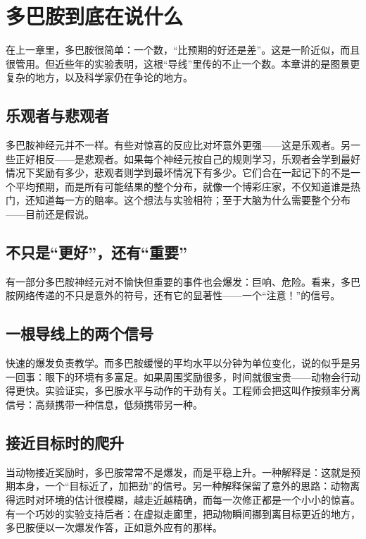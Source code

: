 \chapter{多巴胺到底在说什么}

在上一章里，多巴胺很简单：一个数，“比预期的好还是差”。这是一阶近似，而且很管用。但近些年的实验表明，这根“导线”里传的不止一个数。本章讲的是图景更复杂的地方，以及科学家仍在争论的地方。

\section*{乐观者与悲观者}

多巴胺神经元并不一样。有些对惊喜的反应比对坏意外更强——这是乐观者。另一些正好相反——是悲观者。如果每个神经元按自己的规则学习，乐观者会学到最好情况下奖励有多少，悲观者则学到最坏情况下有多少。它们合在一起记下的不是一个平均预期，而是所有可能结果的整个分布，就像一个博彩庄家，不仅知道谁是热门，还知道每一方的赔率。这个想法与实验相符；至于大脑为什么需要整个分布——目前还是假说。


\section*{不只是“更好”，还有“重要”}

有一部分多巴胺神经元对不愉快但重要的事件也会爆发：巨响、危险。看来，多巴胺网络传递的不只是意外的符号，还有它的显著性——一个“注意！”的信号。

\section*{一根导线上的两个信号}

快速的爆发负责教学。而多巴胺缓慢的平均水平以分钟为单位变化，说的似乎是另一回事：眼下的环境有多富足。如果周围奖励很多，时间就很宝贵——动物会行动得更快。实验证实，多巴胺水平与动作的干劲有关。工程师会把这叫作按频率分离信号：高频携带一种信息，低频携带另一种。

\section*{接近目标时的爬升}

当动物接近奖励时，多巴胺常常不是爆发，而是平稳上升。一种解释是：这就是预期本身，一个“目标近了，加把劲”的信号。另一种解释保留了意外的思路：动物离得远时对环境的估计很模糊，越走近越精确，而每一次修正都是一个小小的惊喜。有一个巧妙的实验支持后者：在虚拟走廊里，把动物瞬间挪到离目标更近的地方，多巴胺便以一次爆发作答，正如意外应有的那样。

